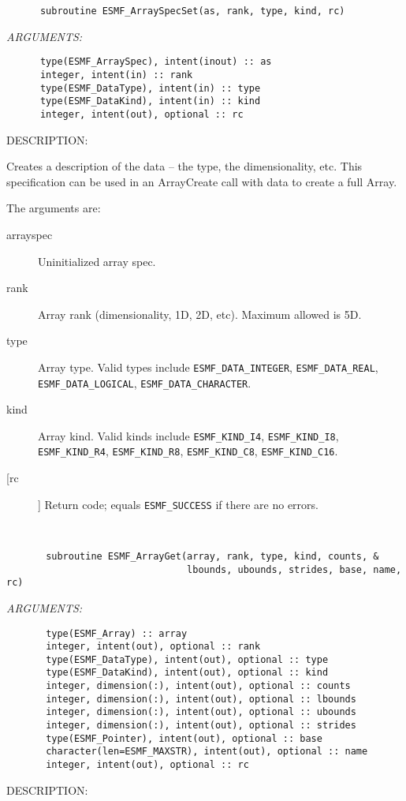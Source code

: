 \begin{verbatim}      subroutine ESMF_ArraySpecSet(as, rank, type, kind, rc)\end{verbatim}{\em ARGUMENTS:}
\begin{verbatim}      type(ESMF_ArraySpec), intent(inout) :: as
      integer, intent(in) :: rank
      type(ESMF_DataType), intent(in) :: type
      type(ESMF_DataKind), intent(in) :: kind
      integer, intent(out), optional :: rc\end{verbatim}
{\sf DESCRIPTION:\\ }


   Creates a description of the data -- the type, the dimensionality, etc.
   This specification can be
   used in an ArrayCreate call with data to create a full Array.
  
   The arguments are:
   \begin{description}
  
   \item[arrayspec]
   Uninitialized array spec.
  
   \item[rank]
   Array rank (dimensionality, 1D, 2D, etc). Maximum allowed is 5D.
  
   \item[type]
   Array type. Valid types include {\tt ESMF\_DATA\_INTEGER},
   {\tt ESMF\_DATA\_REAL}, {\tt ESMF\_DATA\_LOGICAL},
   {\tt ESMF\_DATA\_CHARACTER}.
  
   \item[kind]
   Array kind. Valid kinds include {\tt ESMF\_KIND\_I4},
   {\tt ESMF\_KIND\_I8}, {\tt ESMF\_KIND\_R4}, {\tt ESMF\_KIND\_R8},
   {\tt ESMF\_KIND\_C8}, {\tt ESMF\_KIND\_C16}.
  
   \item[[rc]]
   Return code; equals {\tt ESMF\_SUCCESS} if there are no errors.
  
   \end{description}
   
 
\mbox{}\hrulefill\ 
 

\begin{verbatim}       subroutine ESMF_ArrayGet(array, rank, type, kind, counts, &
                                lbounds, ubounds, strides, base, name, rc)\end{verbatim}{\em ARGUMENTS:}
\begin{verbatim}       type(ESMF_Array) :: array
       integer, intent(out), optional :: rank
       type(ESMF_DataType), intent(out), optional :: type
       type(ESMF_DataKind), intent(out), optional :: kind
       integer, dimension(:), intent(out), optional :: counts
       integer, dimension(:), intent(out), optional :: lbounds
       integer, dimension(:), intent(out), optional :: ubounds
       integer, dimension(:), intent(out), optional :: strides
       type(ESMF_Pointer), intent(out), optional :: base
       character(len=ESMF_MAXSTR), intent(out), optional :: name
       integer, intent(out), optional :: rc\end{verbatim}
{\sf DESCRIPTION:\\ }


